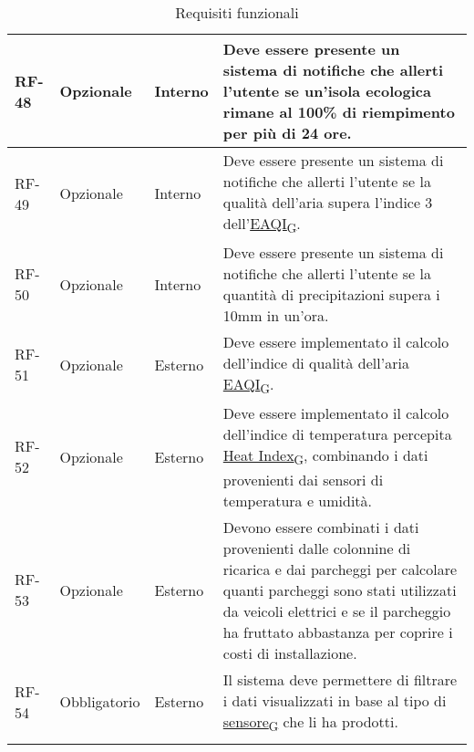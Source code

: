 \begin{longtable}{|>{\centering\arraybackslash}m{}|>{\centering\arraybackslash}m{}|>{\centering\arraybackslash}m{}|>{\centering\arraybackslash}m{}|}
	\\\hline
	RF-48           & Opzionale           & Interno                                                                                                           & Deve essere presente un sistema di notifiche che allerti l'utente se un'isola ecologica rimane al 100\% di riempimento per più di 24 ore.
	\\\hline
	RF-49           & Opzionale           & Interno                                                                                                           & Deve essere presente un sistema di notifiche che allerti l'utente se la qualità dell'aria supera l'indice 3 dell'\href{https://7last.github.io/docs/pb/documentazione-interna/glossario\#european-air-quality-index}{EAQI\textsubscript{G}}.
	\\\hline
	RF-50           & Opzionale           & Interno                                                                                                           & Deve essere presente un sistema di notifiche che allerti l'utente se la quantità di precipitazioni supera i 10mm in un'ora.
	\\\hline
	RF-51           & Opzionale           & Esterno                                                                                                           & Deve essere implementato il calcolo dell'indice di qualità dell'aria \href{https://7last.github.io/docs/pb/documentazione-interna/glossario\#european-air-quality-index}{EAQI\textsubscript{G}}.
	\\\hline
	RF-52           & Opzionale           & Esterno                                                                                                           & Deve essere implementato il calcolo dell'indice di temperatura percepita \href{https://7last.github.io/docs/pb/documentazione-interna/glossario\#heat-index}{Heat Index\textsubscript{G}}, combinando i dati provenienti dai sensori di temperatura e umidità.
	\\\hline
	RF-53           & Opzionale           & Esterno                                                                                                           & Devono essere combinati i dati provenienti dalle colonnine di ricarica e dai parcheggi per calcolare quanti parcheggi sono stati utilizzati da veicoli elettrici e se il parcheggio ha fruttato abbastanza per coprire i costi di installazione.
	\\\hline
	RF-54           & Obbligatorio        & Esterno                                                                                                           & Il sistema deve permettere di filtrare i dati visualizzati in base al tipo di \href{https://7last.github.io/docs/pb/documentazione-interna/glossario\#sensore}{sensore\textsubscript{G}} che li ha prodotti.
	\\\hline
	\caption{Requisiti funzionali}
\end{longtable}

